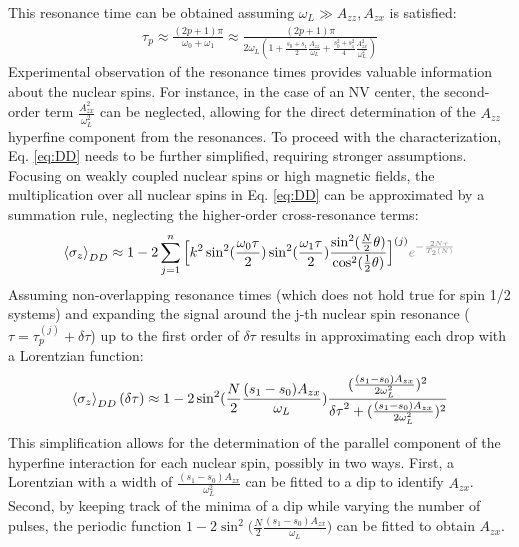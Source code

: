 \documentclass[%
 reprint,
superscriptaddress,
 amsmath,amssymb,
 aps,
]{revtex4-2}
\begin{document}
This resonance time can be obtained assuming $\omega_L \gg A_{zz}, A_{zx}$ is satisfied: 
\begin{gather} \label{eq:resonance}
	\tau_p \approx  \frac{(2p+1) \pi}{\omega_0 + \omega_1} \approx \frac{(2p+1)\pi}{2\omega_L(1+\frac{s_0+s_1}{2} \frac{A_{zz}}{\omega_L}+ \frac{s_0^2+s_1^2}{4}\frac{A_{zx}^2}{\omega_L^2})}
\end{gather}
Experimental observation of the resonance times provides valuable information about the nuclear spins.
For instance, in the case of an NV center, the second-order term $\frac{A_{zx}^2}{\omega_L^2}$ can be neglected, allowing for the direct determination of the $A_{zz}$ hyperfine component from the resonances.
To proceed with the characterization, Eq. \ref{eq:DD} needs to be further simplified, requiring stronger assumptions.
Focusing on weakly coupled nuclear spins or high magnetic fields, the multiplication over all nuclear spins in Eq. \ref{eq:DD} can be approximated by a summation rule, neglecting the higher-order cross-resonance terms:
\small
\begin{gather}
	\expval{\sigma_z}_{DD} \approx 1 -2
	\sum_{j=1}^n \Big[ k^2 	 \sin^2(\frac{\omega_0 \tau}{2}) \sin^2(\frac{\omega_1 \tau}{2}) \frac{\sin^2(\frac{N}{2} \theta)}{\cos^2(\frac{1}{2}\theta)}  \Big]^{(j)} \textcolor{gray}{ e^{-\frac{2N\tau}{T_2(N)}}}
	\label{eq:approx_DD}
\end{gather}
\normalsize
Assuming non-overlapping resonance times (which does not hold true for spin 1/2 systems) and expanding the signal around the j-th nuclear spin resonance ($\tau = \tau_p^{(j)}+\delta \tau$) up to the first order of $\delta \tau$ results in approximating each drop with a Lorentzian function:
\small
\begin{gather}
	\expval{\sigma_z}_{DD} (\delta \tau ) \approx 1 -2\sin^2(\frac{N}{2}\frac{(s_1-s_0)A_{zx}}{\omega_L}) \frac{(\frac{(s_1-s_0)A_{zx}}{2\omega_L^2})^2}{{\delta \tau}^2 +(\frac{(s_1-s_0)A_{zx}}{2\omega_L^2})^2}
\end{gather}
\normalsize
This simplification allows for the determination of the parallel component of the hyperfine interaction for each nuclear spin, possibly in two ways. First, a Lorentzian with a width of $\frac{(s_1-s_0) A_{zx}}{\omega_L^2}$ can be fitted to a dip to identify $A_{zx}$. Second, by keeping track of the minima of a dip while varying the number of pulses, the periodic function $1 - 2 \sin^2\big(\frac{N}{2}\frac{(s_1-s_0) A_{zx}}{\omega_L}\big)$ can be fitted to obtain $A_{zx}$.
\end{document}
